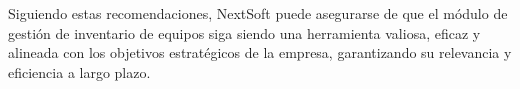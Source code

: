 \documentclass[stu, 12pt, letterpaper, donotrepeattitle, floatsintext, natbib]{apa7}
\begin{document}
Siguiendo estas recomendaciones, NextSoft puede asegurarse de que el módulo de gestión de inventario de equipos siga siendo una herramienta
valiosa, eficaz y alineada con los objetivos estratégicos de la empresa, garantizando su relevancia y eficiencia a largo plazo.
\newpage

\nocite{*}
\end{document}
